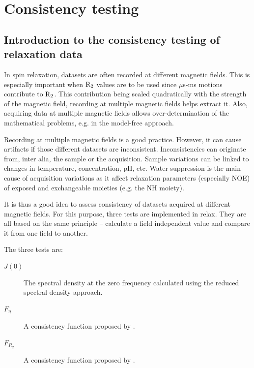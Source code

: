 
\chapter{Consistency testing}



\section{Introduction to the consistency testing of relaxation data}

In spin relaxation, datasets are often recorded at different magnetic fields.  This is especially important when $\mathrm{R}_2$ values are to be used since $\mu$s-ms motions contribute to $\mathrm{R}_2$.  This contribution being scaled quadratically with the strength of the magnetic field, recording at multiple magnetic fields helps extract it.  Also, acquiring data at multiple magnetic fields allows over-determination of the mathematical problems, e.g. in the model-free approach.

Recording at multiple magnetic fields is a good practice.  However, it can cause artifacts if those different datasets are inconsistent.  Inconsistencies can originate from, inter alia, the sample or the acquisition.  Sample variations can be linked to changes in temperature, concentration, pH, etc.  Water suppression is the main cause of acquisition variations as it affect relaxation parameters (especially NOE) of exposed and exchangeable moieties (e.g. the NH moiety).

It is thus a good idea to assess consistency of datasets acquired at different magnetic fields.  For this purpose, three tests are implemented in relax.  They are all based on the same principle -- calculate a field independent value and compare it from one field to another.

The three tests are:

\begin{description}
\item[$J(0)$]  The spectral density at the zero frequency calculated using the reduced spectral density approach.
\item[$F_\eta$]  A consistency function proposed by \citet{Fushman98}.
\item[$F_{R_2}$]  A consistency function proposed by \citet{Fushman98}.
\end{description}


